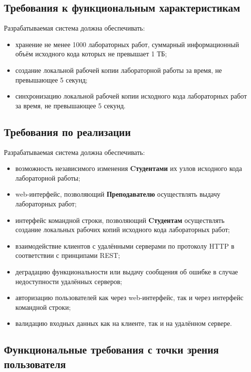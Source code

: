 \documentclass{bmstu}
\begin{document}
  \subsection{Требования к функциональным характеристикам}

  Разрабатываемая система должна обеспечивать:
  \begin{itemize}[label=---]
    \item хранение не менее 1000 лабораторных работ, суммарный
      информационный объём исходного кода которых не превышает 1 ТБ;
    \item создание локальной рабочей копии лабораторной работы за
      время, не превышающее 5 секунд;
    \item синхронизацию локальной рабочей копии исходного кода
      лабораторных работ за время, не превышающее 5 секунд.
  \end{itemize}

  \subsection{Требования по реализации}

  Разрабатываемая система должна обеспечивать:
  \begin{itemize}[label=---]
    \item возможность независимого изменения \textbf{Cтудентами} их узлов
      исходного кода лабораторной работы;
    \item web-интерфейс, позволяющий \textbf{Преподавателю} осуществлять выдачу
      лабораторных работ;
    \item интерфейс командной строки, позволяющий \textbf{Cтудентам}
      осуществлять создание локальных рабочих копий исходного кода
      лабораторных работ;
    \item взаимодействие клиентов с удалёнными серверами по протоколу
      HTTP в соответствии с принципами REST;
    \item деградацию функциональности или выдачу сообщения об ошибке в
      случае недоступности удалённых серверов;
    \item авторизацию пользователей как через web-интерфейс, так и
      через интерфейс командной строки;
    \item валидацию входных данных как на клиенте, так и на удалённом
      сервере.
  \end{itemize}

  \subsection{Функциональные требования с точки зрения пользователя}
\end{document}
